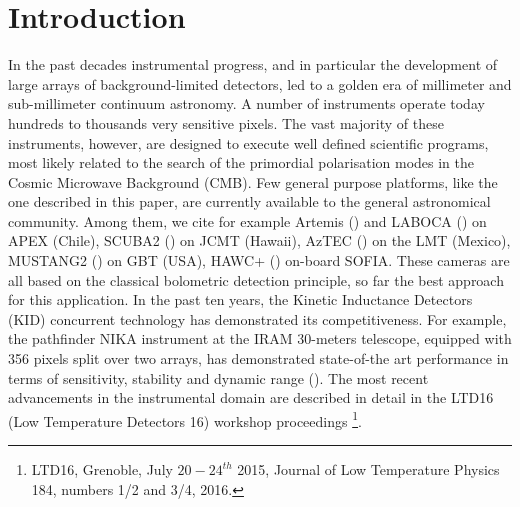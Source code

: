 \documentclass[]{aa} %
\begin{document}

   \maketitle
%

\section{Introduction}

In the past decades instrumental progress, and in particular the development of large arrays of background-limited detectors, led to a golden era of millimeter and sub-millimeter continuum astronomy. A number of instruments operate today hundreds to thousands very sensitive pixels. The vast majority of these instruments, however, are designed to execute well defined scientific programs, most likely related to the search of the primordial polarisation modes in the Cosmic Microwave Background (CMB). Few general purpose platforms, like the one described in this paper, are currently available to the general astronomical community. Among them, we cite for example Artemis (\cite{Reveret2014}) and LABOCA (\cite{Siringo2009}) on APEX (Chile), SCUBA2 (\cite{Holland2013}) on JCMT (Hawaii), AzTEC (\cite{Chavez-Dagostino2016}) on the LMT (Mexico), MUSTANG2 (\cite{Dicker2014}) on GBT (USA), HAWC+ (\cite{Staguhn2016}) on-board SOFIA. These cameras are all based on the classical bolometric detection principle, so far the best approach for this application. In the past ten years, the Kinetic Inductance Detectors (KID) concurrent technology has demonstrated its competitiveness. For example, the pathfinder NIKA instrument at the IRAM 30-meters telescope, equipped with 356 pixels split over two arrays, has demonstrated state-of-the art performance in terms of sensitivity, stability and dynamic range (\cite{Monfardini2010, Monfardini2011, Catalano2014, Adam2014}). The most recent advancements in the instrumental domain are described in detail in the LTD16 (Low Temperature Detectors 16) workshop proceedings \footnote{LTD16, Grenoble, July $20-24^{th}$ 2015,  Journal of Low Temperature Physics 184, numbers 1/2 and 3/4, 2016.}. 

\end{document}
